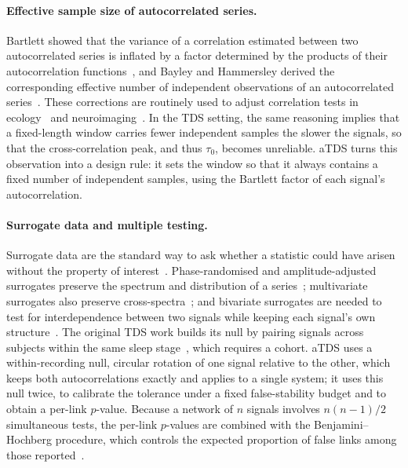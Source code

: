 \documentclass[11pt,a4paper]{article}
\begin{document}
\paragraph{Effective sample size of autocorrelated series.}
Bartlett showed that the variance of a correlation estimated between two autocorrelated series is inflated by a factor determined by the products of their autocorrelation functions~\cite{Bartlett1946TheoreticalSpecification}, and Bayley and Hammersley derived the corresponding effective number of independent observations of an autocorrelated series~\cite{Bayley1946EffectiveNumber}. These corrections are routinely used to adjust correlation tests in ecology~\cite{Pyper1998ComparisonMethods} and neuroimaging~\cite{Afyouni2019EffectiveDegrees}. In the TDS setting, the same reasoning implies that a fixed-length window carries fewer independent samples the slower the signals, so that the cross-correlation peak, and thus $\tau_0$, becomes unreliable. aTDS turns this observation into a design rule: it sets the window so that it always contains a fixed number of independent samples, using the Bartlett factor of each signal's autocorrelation.

\paragraph{Surrogate data and multiple testing.}
Surrogate data are the standard way to ask whether a statistic could have arisen without the property of interest~\cite{Theiler1992TestingNonlinearity,Schreiber2000SurrogateTime,Lancaster2018SurrogateData}. Phase-randomised and amplitude-adjusted surrogates preserve the spectrum and distribution of a series~\cite{Theiler1992TestingNonlinearity,Schreiber1996ImprovedSurrogate}; multivariate surrogates also preserve cross-spectra~\cite{Prichard1994GeneratingSurrogate}; and bivariate surrogates are needed to test for interdependence between two signals while keeping each signal's own structure~\cite{Andrzejak2003BivariateSurrogate}. The original TDS work builds its null by pairing signals across subjects within the same sleep stage~\cite{Bashan2012NetworkPhysiology}, which requires a cohort. aTDS uses a within-recording null, circular rotation of one signal relative to the other, which keeps both autocorrelations exactly and applies to a single system; it uses this null twice, to calibrate the tolerance under a fixed false-stability budget and to obtain a per-link $p$-value. Because a network of $n$ signals involves $n(n-1)/2$ simultaneous tests, the per-link $p$-values are combined with the Benjamini--Hochberg procedure, which controls the expected proportion of false links among those reported~\cite{Benjamini1995ControllingFalse}.
\end{document}
